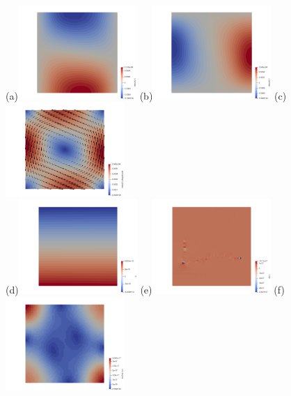 \newpage
\begin{center}
(a)\includegraphics[width=4.5cm]{python_codes/fieldstone_compressible2/BA_104/u.png}
(b)\includegraphics[width=4.5cm]{python_codes/fieldstone_compressible2/BA_104/v.png}
(c)\includegraphics[width=4.5cm]{python_codes/fieldstone_compressible2/BA_104/vel.png}\\
(d)\includegraphics[width=4.5cm]{python_codes/fieldstone_compressible2/BA_104/q.png}    
(e)\includegraphics[width=4.5cm]{python_codes/fieldstone_compressible2/BA_104/divv.png}    
(f)\includegraphics[width=4.5cm]{python_codes/fieldstone_compressible2/BA_104/e2.png}   \\

\end{center}
